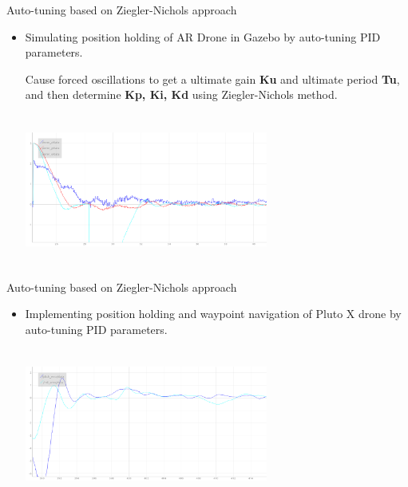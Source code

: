 \documentclass[10pt, a4paper]{beamer}
\begin{document}
\begin{frame}{Auto-tuning based on Ziegler-Nichols approach }
        \begin{itemize}
           	\item Simulating position holding of AR Drone in Gazebo by auto-tuning PID parameters.
           
           	\vspace{1em}Cause forced oscillations to get a ultimate gain \textbf{Ku} and ultimate period \textbf{Tu}, and then determine \textbf{Kp, Ki, Kd} using Ziegler-Nichols method.	\vspace{1em}
           	
           	\includegraphics[width= 8cm , height=5cm]{auto-tuning-ARDrone.png}
           
        \end{itemize}
\end{frame}

\begin{frame}{Auto-tuning based on Ziegler-Nichols approach }
        \begin{itemize}
           	\item Implementing  position holding  and waypoint navigation of Pluto X drone by auto-tuning PID parameters.
           
           	\vspace{1em}
           	
           	\includegraphics[width= 8cm , height=5cm]{demo-1.png}
           
           	\vspace{2em}
           	
           	\end{itemize}
\end{frame}
\end{document}
